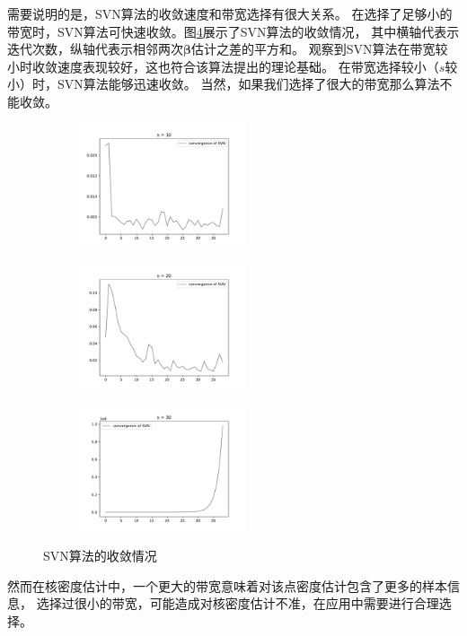 需要说明的是，SVN算法的收敛速度和带宽选择有很大关系。
在选择了足够小的带宽时，SVN算法可快速收敛。图\ref{svn-demo}展示了SVN算法的收敛情况，
其中横轴代表示迭代次数，纵轴代表示相邻两次$\bm{\beta}$估计之差的平方和。
观察到SVN算法在带宽较小时收敛速度表现较好，这也符合该算法提出的理论基础。
在带宽选择较小（$s$较小）时，SVN算法能够迅速收敛。
当然，如果我们选择了很大的带宽那么算法不能收敛。
\begin{figure}[H]
    \centering
    \begin{subfigure}[t]{0.3\textwidth}\label{svn-demo1}
    \includegraphics[width=4.9cm]{pics/chapter2/svn-con-1.pdf}
    \end{subfigure}
    \begin{subfigure}[t]{0.3\textwidth}\label{svn-demo2}
    \includegraphics[width=4.9cm]{pics/chapter2/svn-con-2.pdf}
    \end{subfigure}
    \begin{subfigure}[t]{0.3\textwidth}\label{svn-demo3}
    \includegraphics[width=4.9cm]{pics/chapter2/svn-con-3.pdf}
    \end{subfigure}
    \caption{ \small SVN算法的收敛情况}
    \label{svn-demo}
\end{figure}

然而在核密度估计中，一个更大的带宽意味着对该点密度估计包含了更多的样本信息，
选择过很小的带宽，可能造成对核密度估计不准，在应用中需要进行合理选择。

